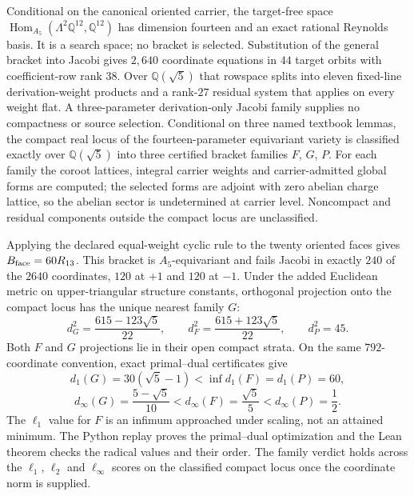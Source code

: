 \documentclass[11pt]{article}
\begin{document}
Conditional on the canonical oriented carrier, the target-free space
\(\operatorname{Hom}_{A_5}(\Lambda^2\mathbb Q^{12},\mathbb Q^{12})\) has
dimension fourteen and an exact rational Reynolds basis. It is a search space;
no bracket is selected. Substitution of the general bracket into Jacobi gives
\(2{,}640\) coordinate equations in \(44\) target orbits with coefficient-row
rank \(38\). Over \(\mathbb Q(\sqrt5)\) that rowspace splits into eleven
fixed-line derivation-weight products and a rank-\(27\) residual system that
applies on every weight flat. A three-parameter derivation-only Jacobi family
supplies no compactness or source selection. Conditional on three named
textbook lemmas, the compact real locus of the fourteen-parameter equivariant
variety is classified exactly over \(\mathbb Q(\sqrt5)\) into three certified
bracket families \(F\), \(G\), \(P\). For each family the coroot lattices,
integral carrier weights and carrier-admitted global forms are computed; the
selected forms are adjoint with zero abelian charge lattice, so the abelian
sector is undetermined at carrier level. Noncompact and residual components
outside the compact locus are unclassified.

Applying the declared equal-weight cyclic rule to the twenty oriented faces
gives \(B_{\rm face}=60R_{13}\). This bracket is \(A_5\)-equivariant and
fails Jacobi in exactly \(240\) of the \(2640\) coordinates, \(120\) at \(+1\)
and \(120\) at \(-1\). Under the added Euclidean metric on upper-triangular
structure constants, orthogonal projection onto the compact locus has the
unique nearest family \(G\):
\[
 d_G^2=\frac{615-123\sqrt5}{22},\qquad
 d_F^2=\frac{615+123\sqrt5}{22},\qquad d_P^2=45 .
\]
Both \(F\) and \(G\) projections lie in their open compact strata. On the same
\(792\)-coordinate convention, exact primal--dual certificates give
\[
 d_1(G)=30(\sqrt5-1)<\inf d_1(F)=d_1(P)=60,
\]
\[
 d_\infty(G)=\frac{5-\sqrt5}{10}
   <d_\infty(F)=\frac{\sqrt5}{5}
   <d_\infty(P)=\frac12.
\]
The \(\ell_1\) value for \(F\) is an infimum approached under scaling, not an
attained minimum. The Python replay proves the primal--dual optimization and
the Lean theorem checks the radical values and their order. The family
verdict holds across the \(\ell_1\), \(\ell_2\) and \(\ell_\infty\) scores on the
classified compact locus once the coordinate norm is supplied.
\end{document}
